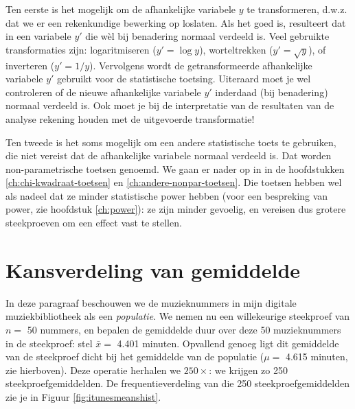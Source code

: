 \documentclass[
]{book}
\begin{document}
Ten eerste is het mogelijk om de afhankelijke variabele \(y\) te
transformeren, d.w.z. dat we er een rekenkundige bewerking op loslaten.
Als het goed is, resulteert dat in een variabele \(y'\) die wèl bij
benadering normaal verdeeld is. Veel gebruikte transformaties zijn:
logaritmiseren (\(y'=\log{y}\)), worteltrekken (\(y'=\sqrt{y}\)), of
inverteren (\(y'=1/y\)). Vervolgens wordt de getransformeerde
afhankelijke variabele \(y'\) gebruikt voor de statistische toetsing.
Uiteraard moet je wel controleren of de nieuwe afhankelijke variabele
\(y'\) inderdaad (bij benadering) normaal verdeeld is. Ook moet je bij de
interpretatie van de resultaten van de analyse rekening houden met de
uitgevoerde transformatie!

Ten tweede is het soms mogelijk om een andere statistische toets te
gebruiken, die niet vereist dat de afhankelijke variabele normaal
verdeeld is. Dat worden non-parametrische toetsen genoemd. We gaan er
nader op in in de hoofdstukken \ref{ch:chi-kwadraat-toetsen} en
\ref{ch:andere-nonpar-toetsen}.
Die toetsen hebben wel als nadeel
dat ze minder statistische power hebben (voor een bespreking van power,
zie hoofdstuk \ref{ch:power}): ze zijn minder gevoelig, en vereisen dus grotere
steekproeven om een effect vast te stellen.

\hypertarget{sec:CentraalLimietTheorema}{%
\section{Kansverdeling van gemiddelde}\label{sec:CentraalLimietTheorema}}

In deze paragraaf beschouwen we de muzieknummers in mijn digitale
muziekbibliotheek als een \emph{populatie}. We nemen nu een willekeurige
steekproef van \(n=\) 50 nummers, en bepalen de gemiddelde duur over deze
50 muzieknummers in de steekproef:
stel \(\bar{x} =\) 4.401 minuten. Opvallend
genoeg ligt dit gemiddelde van de steekproef dicht bij het gemiddelde
van de populatie (\(\mu =\) 4.615 minuten, zie hierboven).
Deze operatie herhalen we
\(250\times\): we krijgen zo 250 steekproefgemiddelden. De
frequentieverdeling van die 250 steekproefgemiddelden zie je in
Figuur \ref{fig:itunesmeanshist}.
\end{document}
